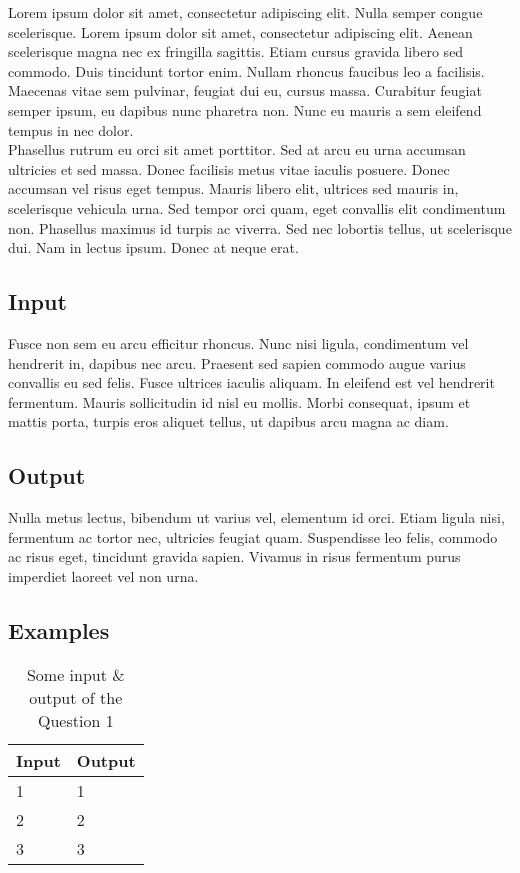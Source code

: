 \noindent
Lorem ipsum dolor sit amet, consectetur adipiscing elit. Nulla semper congue scelerisque. Lorem ipsum dolor sit amet, consectetur adipiscing elit. Aenean scelerisque magna nec ex fringilla sagittis. Etiam cursus gravida libero sed commodo. Duis tincidunt tortor enim. Nullam rhoncus faucibus leo a facilisis. Maecenas vitae sem pulvinar, feugiat dui eu, cursus massa. Curabitur feugiat semper ipsum, eu dapibus nunc pharetra non. Nunc eu mauris a sem eleifend tempus in nec dolor.\\[0.3cm]

\noindent
Phasellus rutrum eu orci sit amet porttitor. Sed at arcu eu urna accumsan ultricies et sed massa. Donec facilisis metus vitae iaculis posuere. Donec accumsan vel risus eget tempus. Mauris libero elit, ultrices sed mauris in, scelerisque vehicula urna. Sed tempor orci quam, eget convallis elit condimentum non. Phasellus maximus id turpis ac viverra. Sed nec lobortis tellus, ut scelerisque dui. Nam in lectus ipsum. Donec at neque erat.\\

\subsection*{Input}
\noindent
Fusce non sem eu arcu efficitur rhoncus. Nunc nisi ligula, condimentum vel hendrerit in, dapibus nec arcu. Praesent sed sapien commodo augue varius convallis eu sed felis. Fusce ultrices iaculis aliquam. In eleifend est vel hendrerit fermentum. Mauris sollicitudin id nisl eu mollis. Morbi consequat, ipsum et mattis porta, turpis eros aliquet tellus, ut dapibus arcu magna ac diam.

\subsection*{Output}
\noindent
Nulla metus lectus, bibendum ut varius vel, elementum id orci. Etiam ligula nisi, fermentum ac tortor nec, ultricies feugiat quam. Suspendisse leo felis, commodo ac risus eget, tincidunt gravida sapien. Vivamus in risus fermentum purus imperdiet laoreet vel non urna.

\subsection*{Examples}
\noindent
\begin{table}[ht!]
\centering
\label{tbl:tabq1}
\begin{tabular}{|p{6cm}|p{6cm}|}
\hline
\multicolumn{1}{|c|}{\textbf{Input}} & \multicolumn{1}{c|}{\textbf{Output}}  \\ \hline
1            & 1           \\ \hline
2            & 2      \\ \hline
3            & 3           \\ \hline
\end{tabular}
\caption{Some input \& output of the Question 1}
\end{table}